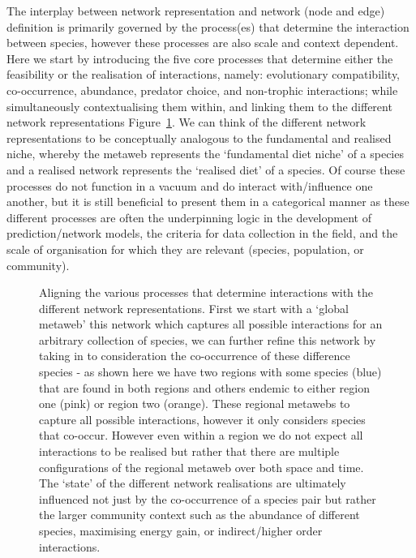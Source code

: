 \documentclass[
]{article}
\begin{document}
The interplay between network representation and network (node and edge)
definition is primarily governed by the process(es) that determine the
interaction between species, however these processes are also scale and
context dependent. Here we start by introducing the five core processes
that determine either the feasibility or the realisation of
interactions, namely: evolutionary compatibility, co-occurrence,
abundance, predator choice, and non-trophic interactions; while
simultaneously contextualising them within, and linking them to the
different network representations Figure~\ref{fig-process}. We can think
of the different network representations to be conceptually analogous to
the fundamental and realised niche, whereby the metaweb represents the
`fundamental diet niche' of a species and a realised network represents
the `realised diet' of a species. Of course these processes do not
function in a vacuum and do interact with/influence one another, but it
is still beneficial to present them in a categorical manner as these
different processes are often the underpinning logic in the development
of prediction/network models, the criteria for data collection in the
field, and the scale of organisation for which they are relevant
(species, population, or community).

\begin{figure}


\caption{\label{fig-process}Aligning the various processes that
determine interactions with the different network representations. First
we start with a `global metaweb' this network which captures all
possible interactions for an arbitrary collection of species, we can
further refine this network by taking in to consideration the
co-occurrence of these difference species - as shown here we have two
regions with some species (blue) that are found in both regions and
others endemic to either region one (pink) or region two (orange). These
regional metawebs to capture all possible interactions, however it only
considers species that co-occur. However even within a region we do not
expect all interactions to be realised but rather that there are
multiple configurations of the regional metaweb over both space and
time. The `state' of the different network realisations are ultimately
influenced not just by the co-occurrence of a species pair but rather
the larger community context such as the abundance of different species,
maximising energy gain, or indirect/higher order interactions.}

\end{figure}%
\end{document}
